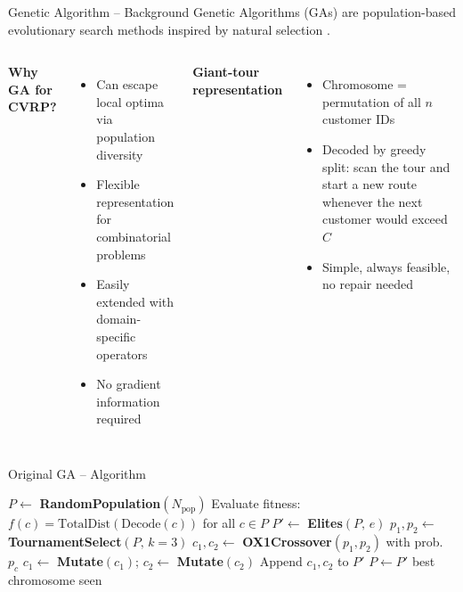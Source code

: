 \documentclass{beamer}
\begin{document}
\begin{frame}{Genetic Algorithm -- Background}
  Genetic Algorithms (GAs) are population-based evolutionary search methods
  inspired by natural selection \cite{holland1975adaptation, goldberg1989genetic}.
  \vspace{6pt}

  \begin{columns}
    \textbf{Why GA for CVRP?}
    \begin{itemize}
      \item Can escape local optima via population diversity
      \item Flexible representation for combinatorial problems
      \item Easily extended with domain-specific operators
      \item No gradient information required
    \end{itemize}

    \textbf{Giant-tour representation}
    \begin{itemize}
      \item Chromosome = permutation of all $n$ customer IDs
      \item Decoded by greedy split: scan the tour and start a new route
            whenever the next customer would exceed $C$
      \item Simple, always feasible, no repair needed
    \end{itemize}
  \end{columns}
\end{frame}

\begin{frame}{Original GA -- Algorithm}
  \begin{algorithm}[H]
  \caption{Original Genetic Algorithm for CVRP}
  \begin{algorithmic}[1]
    \State $P \leftarrow$ \textbf{RandomPopulation}$(N_{\text{pop}})$
      \State Evaluate fitness: $f(c) = \text{TotalDist}(\text{Decode}(c))$ for all $c \in P$
      \State $P' \leftarrow$ \textbf{Elites}$(P,\, e)$  
        \State $p_1, p_2 \leftarrow$ \textbf{TournamentSelect}$(P,\, k=3)$
        \State $c_1, c_2 \leftarrow$ \textbf{OX1Crossover}$(p_1, p_2)$ with prob.\ $p_c$
        \State $c_1 \leftarrow$ \textbf{Mutate}$(c_1)$;\; $c_2 \leftarrow$ \textbf{Mutate}$(c_2)$
        \State Append $c_1, c_2$ to $P'$
      \EndWhile
      \State $P \leftarrow P'$
    \EndFor
    \State \Return best chromosome seen
  \end{algorithmic}
  \end{algorithm}
\end{frame}
\end{document}
